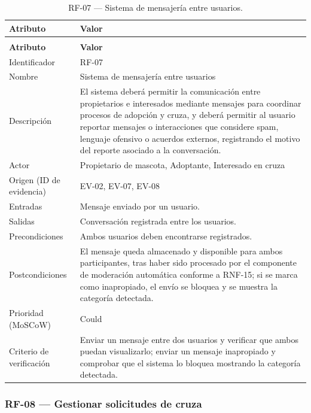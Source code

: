 \documentclass[journal,onecolumn]{IEEEtran}
\makeatletter
\newenvironment{atributos}[2]{%
	\small
	\begin{longtable}{@{}>{\raggedright\arraybackslash}p{4.2cm} >{\raggedright\arraybackslash}p{11.2cm}@{}}
		\caption{#2}\label{tab:#1}\\
		\toprule
		\textbf{Atributo} & \textbf{Valor} \\
		\midrule
		\endfirsthead
		\multicolumn{2}{@{}l}{\small\itshape (continuación)}\\
		\toprule
		\textbf{Atributo} & \textbf{Valor} \\
		\midrule
		\endhead
		\bottomrule
		\endlastfoot
	}{%
	\end{longtable}
	\normalsize
}
\makeatother
\begin{document}
	\begin{atributos}{RF-07}{RF-07 --- Sistema de mensajería entre usuarios.}
		Identificador & RF-07 \\
		Nombre & Sistema de mensajería entre usuarios \\
		Descripción & El sistema deberá permitir la comunicación entre propietarios e interesados mediante mensajes para coordinar procesos de adopción y cruza, y deberá permitir al usuario reportar mensajes o interacciones que considere spam, lenguaje ofensivo o acuerdos externos, registrando el motivo del reporte asociado a la conversación. \\
		Actor & Propietario de mascota, Adoptante, Interesado en cruza \\
		Origen (ID de evidencia) & EV-02, EV-07, EV-08 \\
		Entradas & Mensaje enviado por un usuario. \\
		Salidas & Conversación registrada entre los usuarios. \\
		Precondiciones & Ambos usuarios deben encontrarse registrados. \\
		Postcondiciones & El mensaje queda almacenado y disponible para ambos participantes, tras haber sido procesado por el componente de moderación automática conforme a RNF-15; si se marca como inapropiado, el envío se bloquea y se muestra la categoría detectada. \\
		Prioridad (MoSCoW) & Could \\
		Criterio de verificación & Enviar un mensaje entre dos usuarios y verificar que ambos puedan visualizarlo; enviar un mensaje inapropiado y comprobar que el sistema lo bloquea mostrando la categoría detectada. \\
	\end{atributos}
	
	\subsubsection{RF-08 --- Gestionar solicitudes de cruza}
	
\end{document}
